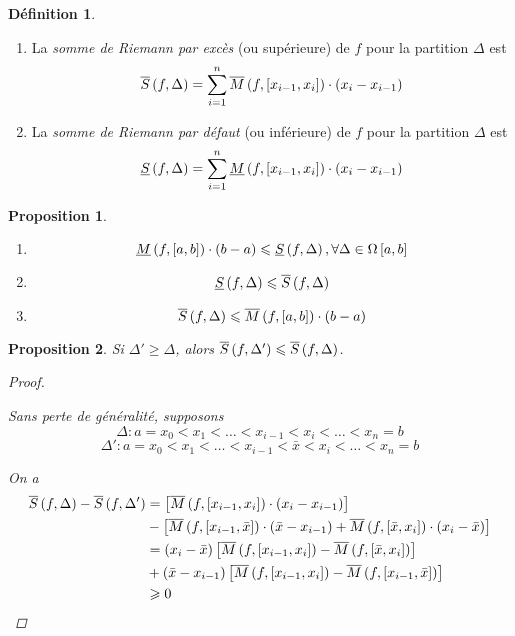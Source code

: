 \documentclass{report}
\newcommand*{\lte}{\leqslant}
\newcommand*{\gte}{\geqslant}
\newtheorem*{prop}{Proposition}
\theoremstyle{definition}
\newtheorem*{defin}{D\'efinition}
\theoremstyle{remark}
\begin{document}
	\begin{defin}
		~

		\begin{enumerate}[label=\alph*)]
			\item La \emph{somme de Riemann par exc\`es} (ou sup\'erieure) de $f$ pour la partition $\Delta$ est
			\[
			\ssup{f}= \displaystyle\sum_{i=1}^{n}\msup{f}[x_{i-1},x_i] \cdot (x_i-x_{i-1})
			\]
			\item La \emph{somme de Riemann par d\'efaut} (ou inf\'erieure) de $f$ pour la partition $\Delta$ est
			\[
			\sinf{f}= \displaystyle\sum_{i=1}^{n}\minf{f}[x_{i-1},x_i] \cdot (x_i-x_{i-1})
			\]
		\end{enumerate}
	\end{defin}

	\newpage
	\begin{prop}
		~

		\begin{enumerate}[label=\alph*)]
			\item
			\[
			\minf{f} \cdot (b-a) \lte \sinf{f}, \forall\Delta\in\partitions
			\]
			\item
			\[
			\sinf{f} \lte \ssup{f}
			\]
			\item
			\[
			\ssup{f} \lte \msup{f} \cdot (b-a)
			\]
		\end{enumerate}
	\end{prop}

	\begin{prop}
		Si $\Delta'\gte\Delta$, alors $\ssup{f}[\Delta']\lte\ssup{f}$.
		\begin{proof}~

			Sans perte de g\'en\'eralit\'e, supposons
			\[
			\Delta:a=x_0<x_1<\dotsc<x_{i-1}<x_i<\dotsc<x_n=b
			\]
			\[
			\Delta':a=x_0<x_1<\dotsc<x_{i-1}<\bar{x}<x_i<\dotsc<x_n=b
			\]

			On a
			\begin{align*}
				\ssup{f}-\ssup{f}[\Delta']&= \left[ \msup{f}[x_{i-1},x_i] \cdot (x_i-x_{i-1}) \right]\\
				&- \left[ \msup{f}[x_{i-1},\bar{x}] \cdot (\bar{x}-x_{i-1}) + \msup{f}[\bar{x},x_i] \cdot (x_i-\bar{x}) \right]\\
				&= (x_i-\bar{x}) \left[ \msup{f}[x_{i-1},x_i] - \msup{f}[\bar{x},x_i] \right]\\
				&+ (\bar{x}-x_{i-1}) \left[ \msup{f}[x_{i-1},x_i] - \msup{f}[x_{i-1},\bar{x}] \right]\\
				&\gte 0
			\end{align*}
		\end{proof}
	\end{prop}
\end{document}
